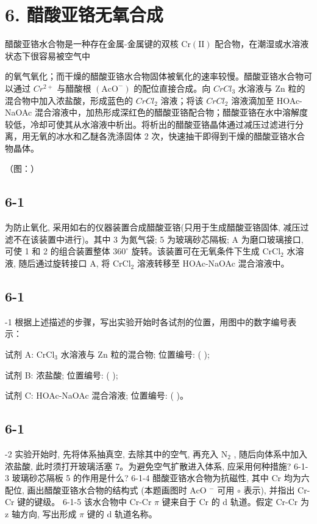 \section*{6. 醋酸亚铬无氧合成}
醋酸亚铬水合物是一种存在金属-金属键的双核 $\mathrm{Cr(II)}$ 配合物，在潮湿或水溶液状态下很容易被空气中

的氧气氧化；而干燥的醋酸亚铬水合物固体被氧化的速率较慢。醋酸亚铬水合物可以通过 $Cr^{2+}$ 与醋酸根 $(\mathrm{AcO}^{-})$ 的配位直接合成。向 $CrCl_{3}$ 水溶液与 Zn 粒的混合物中加入浓盐酸，形成蓝色的 $CrCl_{2}$ 溶液；将该 $CrCl_{2}$ 溶液滴加至 HOAc-NaOAc 混合溶液中，加热形成深红色的醋酸亚铬配合物；醋酸亚铬在水中溶解度较低，冷却可使其从水溶液中析出。将析出的醋酸亚铬晶体通过减压过滤进行分离，用无氧的冰水和乙醚各洗涤固体 2 次，快速抽干即得到干燥的醋酸亚铬水合物晶体。

（图：）

\subsection*{6-1}
为防止氧化, 采用如右的仪器装置合成醋酸亚铬(只用于生成醋酸亚铬固体, 减压过滤不在该装置中进行)。其中 3 为氮气袋; 5 为玻璃砂芯隔板; A 为磨口玻璃接口, 可使 1 和 2 的组合装置整体 ${360}^{ \circ  }$ 旋转。该装置可在无氧条件下生成 ${\mathrm{{CrCl}}}_{2}$ 水溶液, 随后通过旋转接口 A, 将 ${\mathrm{{CrCl}}}_{2}$ 溶液转移至 HOAc-NaOAc 混合溶液中。

\subsection*{6-1}
-1 根据上述描述的步骤，写出实验开始时各试剂的位置，用图中的数字编号表示：

试剂 A: $\mathrm{CrCl}_{3}$ 水溶液与 $\mathrm{Zn}$ 粒的混合物; 位置编号: ( );

试剂 B: 浓盐酸; 位置编号: ( );

试剂 C: HOAc-NaOAc 混合溶液; 位置编号: ( )。

\subsection*{6-1}
-2 实验开始时, 先将体系抽真空, 去除其中的空气, 再充入 $\mathrm{N}_{2}$ , 随后向体系中加入浓盐酸, 此时须打开玻璃活塞 7。为避免空气扩散进入体系, 应采用何种措施? 6-1-3 玻璃砂芯隔板 5 的作用是什么? 6-1-4 醋酸亚铬水合物为抗磁性, 其中 Cr 均为六配位, 画出醋酸亚铬水合物的结构式 (本题画图时 AcO $^-$ 可用 $\circ$ 表示), 并指出 Cr-Cr 键的键级。 6-1-5 该水合物中 Cr-Cr $\pi$ 键来自于 Cr 的 d 轨道。假定 Cr-Cr 为 z 轴方向, 写出形成 $\pi$ 键的 d 轨道名称。

